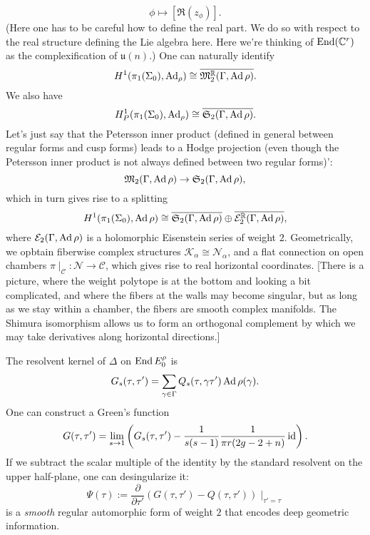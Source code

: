 \documentclass[reqno]{amsart} 
\numberwithin{theorem}{section}
\numberwithin{equation}{section}
\begin{document}
\begin{equation*}
  \phi \mapsto[\Re(z_\phi)].
\end{equation*}
(Here one has to be careful how to define the real part.  We do so with respect to the real structure defining the Lie algebra here.  Here we're thinking of $\operatorname{End}(\mathbb{C}^r)$ as the complexification of $\mathfrak{u}(n)$.)  One can naturally identify
\begin{equation*}
  H^1(\pi_1(\Sigma_0), \operatorname{Ad}_\rho) \cong \overline{\mathfrak{M}_2^{\mathbb{R}}(\Gamma, \operatorname{Ad} \rho)}.
\end{equation*}
We also have
\begin{equation*}
  H^1_P(\pi_1(\Sigma_0), \operatorname{Ad}_\rho)
  \cong
  \overline{\mathfrak{S}_2(\Gamma, \operatorname{Ad} \rho)}.
\end{equation*}
Let's just say that the Petersson inner product (defined in general between regular forms and cusp forms) leads to a Hodge projection (even though the Petersson inner product is not always defined between two regular forms)':
\begin{equation*}
  \mathfrak{M}_2(\Gamma, \operatorname{Ad} \rho) \rightarrow \mathfrak{S}_2(\Gamma, \operatorname{Ad} \rho),
\end{equation*}
which in turn gives rise to a splitting
\begin{equation*}
  H^1(\pi_1(\Sigma_0), \operatorname{Ad} \rho) \cong \overline{\mathfrak{S}_2(\Gamma, \operatorname{Ad} \rho)} \oplus \overline{\mathcal{E}_2^{\mathbb{R}}(\Gamma, \operatorname{Ad} \rho)},
\end{equation*}
where $\mathcal{E}_2(\Gamma, \operatorname{Ad} \rho)$ is a holomorphic Eisenstein series of weight $2$.  Geometrically, we opbtain fiberwise complex structures $\mathcal{K}_\alpha \cong \mathcal{N}_\alpha$, and a flat connection on open chambers $\pi \mid_{\mathcal{C}} : \mathcal{N} \rightarrow \mathcal{C}$, which gives rise to real horizontal coordinates.  [There is a picture, where the weight polytope is at the bottom and looking a bit complicated, and where the fibers at the walls may become singular, but as long as we stay within a chamber, the fibers are smooth complex manifolds.  The Shimura isomorphism allows us to form an orthogonal complement by which we may take derivatives along horizontal directions.]

The resolvent kernel of $\Delta$ on $\operatorname{End} E_0^\rho$ is
\begin{equation*}
  G_s(\tau, \tau ') = \sum_{\gamma \in \Gamma} Q_s(\tau, \gamma \tau ') \operatorname{Ad} \rho(\gamma).
\end{equation*}
One can construct a Green's function
\begin{equation*}
  G(\tau, \tau ') = \lim_{s \rightarrow 1} \left( G_s(\tau, \tau ') - \frac{1}{s(s - 1)} \frac{1}{ \pi r(2 g - 2 + n)} \operatorname{id} \right).
\end{equation*}
If we subtract the scalar multiple of the identity by the standard resolvent on the upper half-plane, one can desingularize it:
\begin{equation*}
  \Psi(\tau) := \frac{\partial}{ \partial \tau '} \left( G(\tau, \tau ') - Q(\tau, \tau ') \right) \mid_{\tau ' = \tau}
\end{equation*}
is a \emph{smooth} regular automorphic form of weight $2$ that encodes deep geometric information.
\end{document}
